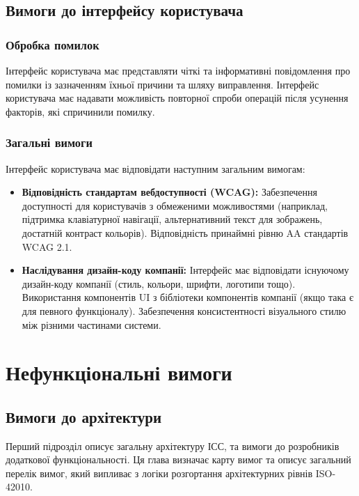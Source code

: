\documentclass{article}
\begin{document}
\subsection{Вимоги до інтерфейсу користувача}

\subsubsection{Обробка помилок}
Інтерфейс користувача має представляти чіткі та інформативні повідомлення про помилки із
зазначенням їхньої причини та шляху виправлення. Інтерфейс користувача має надавати можливість
повторної спроби операцій після усунення факторів, які спричинили помилку.

\subsubsection{Загальні вимоги}
Інтерфейс користувача має відповідати наступним загальним вимогам:

\begin{itemize}
    \item \textbf{Відповідність стандартам вебдоступності (WCAG):} Забезпечення доступності для
           користувачів з обмеженими можливостями (наприклад, підтримка клавіатурної навігації,
           альтернативний текст для зображень, достатній контраст кольорів). Відповідність принаймні рівню AA стандартів WCAG 2.1.
    \item \textbf{Наслідування дизайн-коду компанії:} Інтерфейс має відповідати існуючому дизайн-коду
           компанії (стиль, кольори, шрифти, логотипи тощо). Використання компонентів UI з бібліотеки
           компонентів компанії (якщо така є для певного функціоналу). Забезпечення консистентності
           візуального стилю між різними частинами системи.
\end{itemize}

\newpage
\section{Нефункціональні вимоги}

\subsection{Вимоги до архітектури}

Перший підрозділ описує загальну архітектуру ІСС, та вимоги до розробників додаткової функціональності.
Ця глава визначає карту вимог та описує загальний перелік вимог, який випливає з логіки розгортання
архітектурних рівнів ISO-42010.
\end{document}
